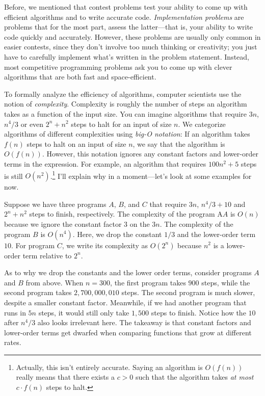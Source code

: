Before, we mentioned that contest problems test your ability to come up with efficient algorithms and to write accurate code. \emph{Implementation problems} are problems that for the most part, assess the latter---that is, your ability to write code quickly and accurately. However, these problems are usually only common in easier contests, since they don't involve too much thinking or creativity; you just have to carefully implement what's written in the problem statement. Instead, most competitive programming problems ask you to come up with clever algorithms that are both fast and space-efficient.

To formally analyze the efficiency of algorithms, computer scientists use the notion of \emph{complexity}. Complexity is roughly the number of steps an algorithm takes as a function of the input size. You can imagine algorithms that require $3n$, $n^4/3$ or even $2^n + n^2$ steps to halt for an input of size $n$. We categorize algorithms of different complexities using \emph{big-O notation}: If an algorithm takes $f(n)$ steps to halt on an input of size $n$, we say that the algorithm is $O(f(n))$. However, this notation ignores any constant factors and lower-order terms in the expression. For example, an algorithm that requires $100n^2 + 5$ steps is still $O(n^2)$.\footnote{Actually, this isn't entirely accurate. Saying an algorithm is $O(f(n))$ really means that there exists a $c > 0$ such that the algorithm takes \emph{at most} $c\cdot f(n)$ steps to halt.} I'll explain why in a moment---let's look at some examples for now. 

Suppose we have three programs $A$, $B$, and $C$ that require $3n$, $n^4/3+10$ and $2^n + n^2$ steps to finish, respectively. The complexity of the program A$A$ is $O(n)$ because we ignore the constant factor $3$ on the $3n$. The complexity of the program $B$ is $O(n^4)$. Here, we drop the constant $1/3$ and the lower-order term $10$. For program $C$, we write its complexity as $O(2^n)$ because $n^2$ is a lower-order term relative to $2^n$.

As to why we drop the constants and the lower order terms, consider programs $A$ and $B$ from above. When $n=300$, the first program takes $900$ steps, while the second program takes $2,700,000,010$ steps. The second program is much slower, despite a smaller constant factor. Meanwhile, if we had another program that runs in $5n$ steps, it would still only take $1,500$ steps to finish. Notice how the $10$ after $n^4/3$ also looks irrelevant here. The takeaway is that constant factors and lower-order terms get dwarfed when comparing functions that grow at different rates. 

